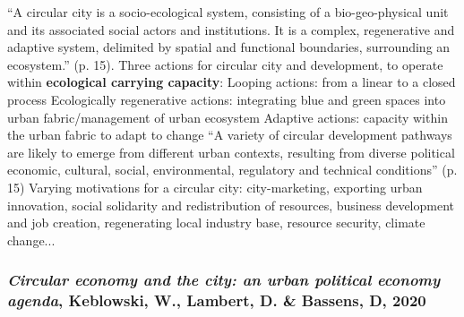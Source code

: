 \documentclass{article}
\begin{document}
\begin{outline}
	\1 ``A circular city is a socio-ecological system, consisting of a bio-geo-physical unit and its associated social actors and institutions. It is a complex, regenerative and adaptive system, delimited by spatial and functional boundaries, surrounding an ecosystem.'' (p. 15). Three actions for circular city and development, to operate within \textbf{ecological carrying capacity}:
		\2 Looping actions: from a linear to a closed process
		\2 Ecologically regenerative actions: integrating blue and green spaces into urban fabric/management of urban ecosystem
		\2 Adaptive actions: capacity within the urban fabric to adapt to change
	\1 ``A variety of circular development pathways are likely to emerge from different urban contexts, resulting from diverse political economic, cultural, social, environmental, regulatory and technical conditions'' (p. 15)
	\1 Varying motivations for a circular city: city-marketing, exporting urban innovation, social solidarity and redistribution of resources, business development and job creation, regenerating local industry base, resource security, climate change... 
\end{outline}

\subsubsection{\textit{Circular economy and the city: an urban political economy agenda}, Keblowski, W., Lambert, D. \& Bassens, D, 2020}
\end{document}
